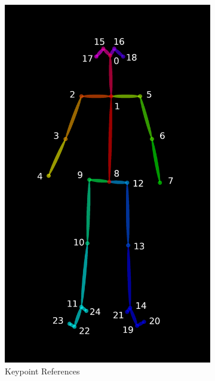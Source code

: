 \begin{figure}[ht]
\begin{subfigure}[b]{.32\textwidth}
		\includegraphics[width=0.765\linewidth]{img/chapter5_implementation/keypoints_pose_25.png}
		\caption{Keypoint References}
	\end{subfigure}
	\hspace{\fill} 
	\begin{subfigure}[b]{.32\textwidth}
		\centering

\end{subfigure}
\end{figure}
